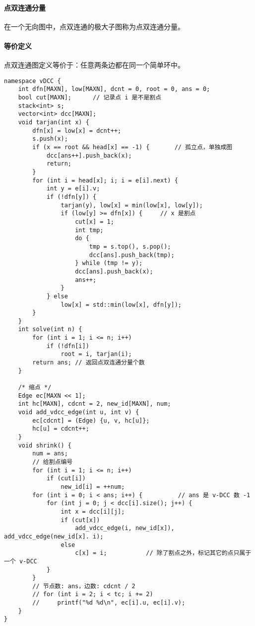 \paragraph{点双连通分量} 在一个无向图中，点双连通的极大子图称为点双连通分量。
\paragraph{等价定义} 点双连通图定义等价于：任意两条边都在同一个简单环中。

\begin{verbatim}
namespace vDCC {
    int dfn[MAXN], low[MAXN], dcnt = 0, root = 0, ans = 0;
    bool cut[MAXN];      // 记录点 i 是不是割点
    stack<int> s;
    vector<int> dcc[MAXN];
    void tarjan(int x) {
        dfn[x] = low[x] = dcnt++;
        s.push(x);
        if (x == root && head[x] == -1) {       // 孤立点，单独成图 
            dcc[ans++].push_back(x);
            return;
        }
        for (int i = head[x]; i; i = e[i].next) {
            int y = e[i].v;
            if (!dfn[y]) {
                tarjan(y), low[x] = min(low[x], low[y]);
                if (low[y] >= dfn[x]) {     // x 是割点 
                    cut[x] = 1;
                    int tmp;
                    do {
                        tmp = s.top(), s.pop();
                        dcc[ans].push_back(tmp);
                    } while (tmp != y);
                    dcc[ans].push_back(x);
                    ans++;
                }
            } else
                low[x] = std::min(low[x], dfn[y]);
        }
    }
    int solve(int n) {
        for (int i = 1; i <= n; i++)
            if (!dfn[i])
                root = i, tarjan(i);
        return ans; // 返回点双连通分量个数
    }

    /* 缩点 */
    Edge ec[MAXN << 1];
    int hc[MAXN], cdcnt = 2, new_id[MAXN], num;
    void add_vdcc_edge(int u, int v) {
        ec[cdcnt] = (Edge) {u, v, hc[u]};
        hc[u] = cdcnt++;
    }
    void shrink() {
        num = ans;
        // 给割点编号
        for (int i = 1; i <= n; i++)
            if (cut[i])
                new_id[i] = ++num;
        for (int i = 0; i < ans; i++) {          // ans 是 v-DCC 数 -1
            for (int j = 0; j < dcc[i].size(); j++) {
                int x = dcc[i][j];
                if (cut[x])
                    add_vdcc_edge(i, new_id[x]), add_vdcc_edge(new_id[x]. i);
                else
                    c[x] = i;           // 除了割点之外，标记其它的点只属于一个 v-DCC
            }
        }
        // 节点数: ans，边数: cdcnt / 2
        // for (int i = 2; i < tc; i += 2)
        //     printf("%d %d\n", ec[i].u, ec[i].v);
    }
}    
\end{verbatim}

